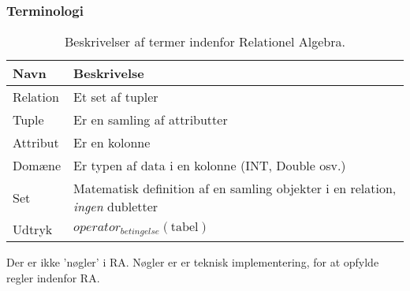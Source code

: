 \subsubsection{Terminologi}

\begin{table}[H]
	\begin{tabu}{lX}
		\toprule
		\textbf{Navn} & \textbf{Beskrivelse}\\
		\midrule
		Relation & Et set af tupler\\
		Tuple & Er en samling af attributter\\
		Attribut & Er en kolonne\\
		Domæne & Er typen af data i en kolonne (INT, Double osv.)\\
		Set & Matematisk definition af en samling objekter i en relation, \textit{ingen} dubletter\\
		Udtryk & $operator_{betingelse}(\text{tabel})$\\
		\bottomrule
	\end{tabu}
	\caption{Beskrivelser af termer indenfor Relationel Algebra.}
\end{table}

Der er ikke 'nøgler' i RA. Nøgler er er teknisk implementering, for at opfylde regler indenfor RA.

%

%
